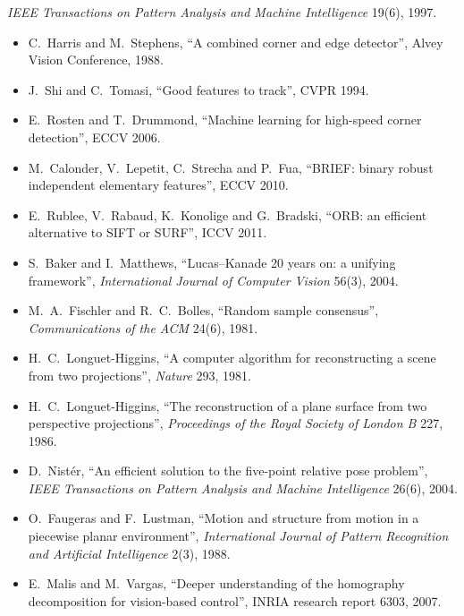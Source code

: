 \begin{description}[leftmargin=1.5em,style=nextline,font=\normalfont]
\begin{itemize}[nosep]
  \emph{IEEE Transactions on Pattern Analysis and Machine Intelligence}
  19(6), 1997.
\end{itemize}
\item[Features and matching]
\begin{itemize}[nosep]
\item C.~Harris and M.~Stephens, ``A combined corner and edge
  detector'', Alvey Vision Conference, 1988.
\item J.~Shi and C.~Tomasi, ``Good features to track'', CVPR 1994.
\item E.~Rosten and T.~Drummond, ``Machine learning for high-speed
  corner detection'', ECCV 2006.
\item M.~Calonder, V.~Lepetit, C.~Strecha and P.~Fua, ``BRIEF: binary
  robust independent elementary features'', ECCV 2010.
\item E.~Rublee, V.~Rabaud, K.~Konolige and G.~Bradski, ``ORB: an
  efficient alternative to SIFT or SURF'', ICCV 2011.
\item S.~Baker and I.~Matthews, ``Lucas--Kanade 20 years on: a unifying
  framework'', \emph{International Journal of Computer Vision} 56(3),
  2004.
\item M.~A.~Fischler and R.~C.~Bolles, ``Random sample consensus'',
  \emph{Communications of the ACM} 24(6), 1981.
\end{itemize}
\item[Two-view geometry]
\begin{itemize}[nosep]
\item H.~C.~Longuet-Higgins, ``A computer algorithm for reconstructing a
  scene from two projections'', \emph{Nature} 293, 1981.
\item H.~C.~Longuet-Higgins, ``The reconstruction of a plane surface from
  two perspective projections'', \emph{Proceedings of the Royal Society
  of London B} 227, 1986.
\item D.~Nist\'er, ``An efficient solution to the five-point relative
  pose problem'', \emph{IEEE Transactions on Pattern Analysis and Machine
  Intelligence} 26(6), 2004.
\item O.~Faugeras and F.~Lustman, ``Motion and structure from motion in a
  piecewise planar environment'', \emph{International Journal of Pattern
  Recognition and Artificial Intelligence} 2(3), 1988.
\item E.~Malis and M.~Vargas, ``Deeper understanding of the homography
  decomposition for vision-based control'', INRIA research report 6303,
  2007.
\end{itemize}

\end{description}
